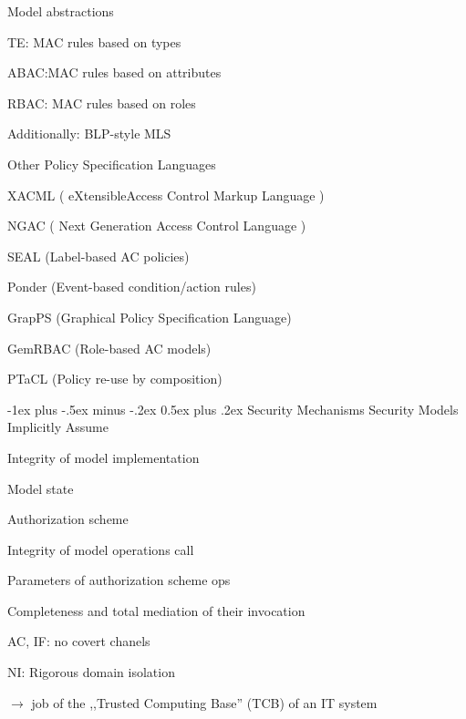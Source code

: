 \documentclass[a4paper]{article}
\makeatletter
\renewcommand{\section}{\@startsection{section}{1}{0mm}%
                {-1ex plus -.5ex minus -.2ex}%
                {0.5ex plus .2ex}%
                {\normalfont\large\bfseries}}
\makeatother
\begin{document}
\begin{multicols}{3}
    Model abstractions
    \begin{itemize*}
        \item TE: MAC rules based on types
        \item ABAC:MAC rules based on attributes
        \item RBAC: MAC rules based on roles
        \item Additionally: BLP-style MLS
    \end{itemize*}

    Other Policy Specification Languages
    \begin{itemize*}
        \item XACML ( eXtensibleAccess Control Markup Language )
        \item NGAC ( Next Generation Access Control Language )
        \item SEAL (Label-based AC policies)
        \item Ponder (Event-based condition/action rules)
        \item GrapPS (Graphical Policy Specification Language)
        \item GemRBAC (Role-based AC models)
        \item PTaCL (Policy re-use by composition)
    \end{itemize*}

    \section{Security Mechanisms}
    Security Models Implicitly Assume
    \begin{itemize*}
        \item Integrity of model implementation
        \begin{itemize*}
            \item Model state
            \item Authorization scheme
        \end{itemize*}
        \item Integrity of model operations call
        \begin{itemize*}
            \item Parameters of authorization scheme ops
            \item Completeness and total mediation of their invocation
        \end{itemize*}
        \item AC, IF: no covert chanels
        \item NI: Rigorous domain isolation
        \item[$\rightarrow$] job of the ,,Trusted Computing Base'' (TCB) of an IT system
    \end{itemize*}


\end{multicols}
\end{document}
